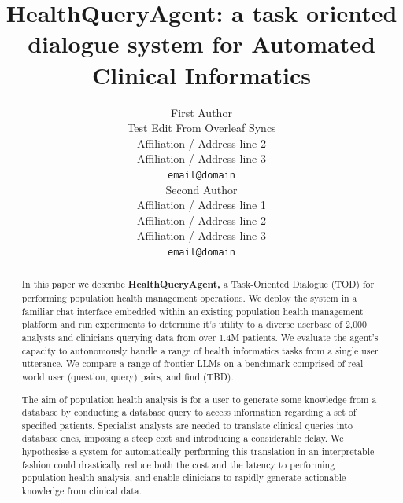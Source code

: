 \documentclass[11pt]{article}
\title{HealthQueryAgent: a task oriented dialogue system for Automated Clinical Informatics}
\author{First Author \\
  Test Edit From Overleaf Syncs \\
  Affiliation / Address line 2 \\
  Affiliation / Address line 3 \\
  \texttt{email@domain} \\\And
  Second Author \\
  Affiliation / Address line 1 \\
  Affiliation / Address line 2 \\
  Affiliation / Address line 3 \\
  \texttt{email@domain} \\}
\begin{document}
\maketitle
\begin{abstract}
In this paper we describe \textbf{HealthQueryAgent,} a Task-Oriented Dialogue (TOD) for performing population health management operations. We deploy the system in a familiar chat interface embedded within an existing population health management platform and run experiments to determine it's utility to a diverse userbase of 2,000 analysts and clinicians querying data from over 1.4M patients. We evaluate the agent's capacity to autonomously handle a range of health informatics tasks from a single user utterance. We compare a range of frontier LLMs on a benchmark comprised of real-world user (question, query) pairs, and find (TBD).
	\citet{jiang_medagentbench_2025}

The aim of population health analysis is for a user to generate some knowledge from a database by conducting a database query to access information regarding a set of specified patients. 
Specialist analysts are needed to translate clinical queries into database ones, imposing a steep cost and introducing a considerable delay. We hypothesise a system for automatically performing this translation in an interpretable fashion could drastically reduce both the cost and the latency to performing population health analysis, and enable clinicians to rapidly generate actionable knowledge from clinical data.

\end{abstract}
\end{document}
